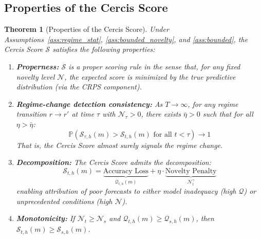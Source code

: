 \documentclass[12pt,a4paper]{article}
\newtheorem{theorem}{Theorem}[section]
\begin{document}
\subsection{Properties of the Cercis Score}

\begin{theorem}[Properties of the Cercis Score]
\label{thm:cercis_props}
Under Assumptions~\ref{ass:regime_stat}, \ref{ass:bounded_novelty},
and \ref{ass:bounded}, the Cercis Score $\mathcal{S}$ satisfies the
following properties:

\begin{enumerate}[label=(\roman*), leftmargin=*]
    \item \textbf{Properness:} $\mathcal{S}$ is a proper scoring rule
    in the sense that, for any fixed novelty level $\mathcal{N}$,
    the expected score is minimized by the true predictive distribution
    (via the CRPS component).

    \item \textbf{Regime-change detection consistency:} As $T \to \infty$,
    for any regime transition $r \to r'$ at time $\tau$ with
    $\mathcal{N}_{\tau} > 0$, there exists $\bar{\eta} > 0$ such that
    for all $\eta > \bar{\eta}$:
    \begin{equation}
        \mathbb{P}\left(\mathcal{S}_{\tau,h}(m) > \mathcal{S}_{t,h}(m)
        \text{ for all } t < \tau\right) \to 1 \label{eq:consistency}
    \end{equation}
    That is, the Cercis Score almost surely signals the regime change.

    \item \textbf{Decomposition:} The Cercis Score admits the
    decomposition:
    \begin{equation}
        \mathcal{S}_{t,h}(m) = \underbrace{\text{Accuracy Loss}}_{
        \mathcal{Q}_{t,h}(m)} + \eta \cdot
        \underbrace{\text{Novelty Penalty}}_{\mathcal{N}_t^{\gamma}}
        \label{eq:decomp}
    \end{equation}
    enabling attribution of poor forecasts to either model inadequacy
    (high $\mathcal{Q}$) or unprecedented conditions (high $\mathcal{N}$).

    \item \textbf{Monotonicity:} If $\mathcal{N}_t \geq \mathcal{N}_s$ and
    $\mathcal{Q}_{t,h}(m) \geq \mathcal{Q}_{s,h}(m)$, then
    $\mathcal{S}_{t,h}(m) \geq \mathcal{S}_{s,h}(m)$.
\end{enumerate}
\end{theorem}
\end{document}
